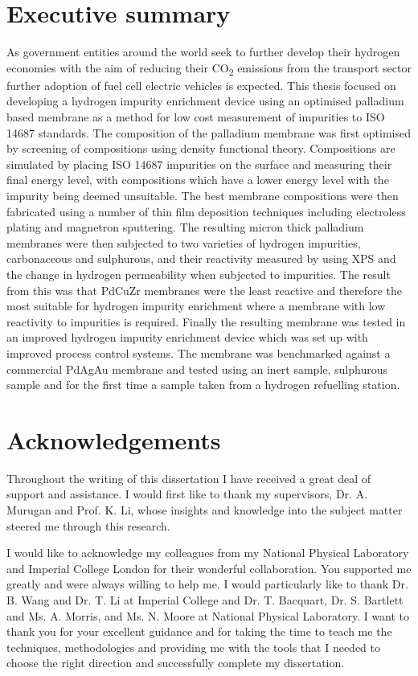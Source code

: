 \chapter*{Executive summary}
As government entities around the world seek to further develop their hydrogen economies with the aim of reducing their CO\textsubscript{2} emissions from the transport sector further adoption of fuel cell electric vehicles is expected. This thesis focused on developing a hydrogen impurity enrichment device using an optimised palladium based membrane as a method for low cost measurement of impurities to ISO 14687 standards. The composition of the palladium membrane was first optimised by screening of compositions using density functional theory. Compositions are simulated by placing ISO 14687 impurities on the surface and measuring their final energy level, with compositions which have a lower energy level with the impurity being deemed unsuitable. The best membrane compositions were then fabricated using a number of thin film deposition techniques including electroless plating and magnetron sputtering. The resulting micron thick palladium membranes were then subjected to two varieties of hydrogen impurities, carbonaceous and sulphurous, and  their reactivity measured by using XPS and the change in hydrogen permeability when subjected to impurities. The result from this was that PdCuZr membranes were the least reactive and therefore the most suitable for hydrogen impurity enrichment where a membrane with low reactivity to impurities is required. Finally the resulting membrane was tested in an improved hydrogen impurity enrichment device which was set up with improved process control systems. The membrane was benchmarked against a commercial PdAgAu membrane and tested using an inert sample, sulphurous sample and for the first time a sample taken from a hydrogen refuelling station.

\chapter*{Acknowledgements}
Throughout the writing of this dissertation I have received a great deal of support and assistance. I  would  first  like  to  thank  my  supervisors,  Dr.  A.  Murugan and Prof. K. Li, whose insights and knowledge into the subject matter steered me through this research.

I would like to acknowledge my colleagues from my National Physical Laboratory and Imperial College London for their wonderful collaboration. You supported me greatly and were always willing to help me. I would particularly like to thank Dr. B. Wang and Dr. T. Li at Imperial College and Dr. T. Bacquart, Dr. S. Bartlett and Ms. A. Morris, and Ms. N. Moore at National Physical Laboratory. I want to thank you for your excellent guidance and  for  taking the time to teach me the techniques, methodologies and providing  me  with  the  tools  that I  needed  to  choose  the  right  direction  and  successfully complete my dissertation.

